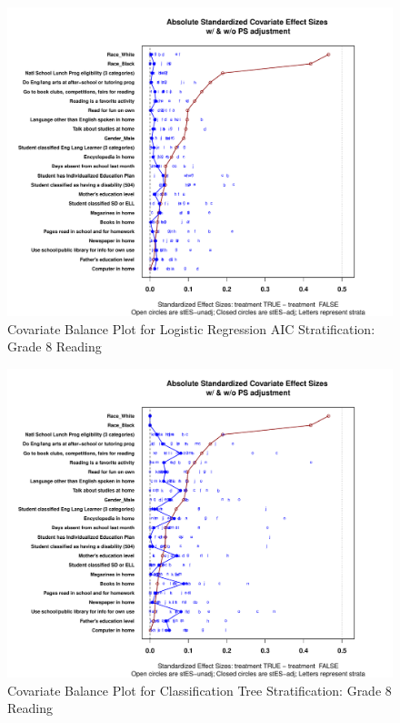 \documentclass[letterpaper,12p,twoside]{article} %
\begin{document}
\begin{figure}
\begin{center}
\includegraphics[width=\textwidth]{../Figures2009/g8read-lrAIC-balance.pdf}
\caption{Covariate Balance Plot for Logistic Regression AIC Stratification: Grade 8 Reading}
\end{center}
\end{figure}

\begin{figure}
\begin{center}
\includegraphics[width=\textwidth]{../Figures2009/g8read-tree-balance.pdf}
\caption{Covariate Balance Plot for Classification Tree Stratification: Grade 8 Reading}
\end{center}
\end{figure}
\end{document}
